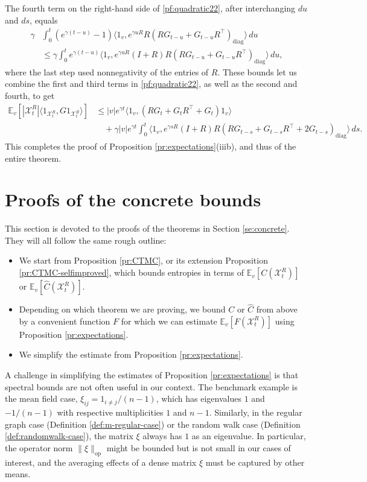 \documentclass[11pt,reqno]{amsart}
\numberwithin{equation}{section}
\theoremstyle{definition}
\def\CC{{C}}
\def\E{{\mathbb E}}
\def\X{{\mathcal X}}
\begin{document}
The fourth term on the right-hand side of  \eqref{pf:quadratic22}, after interchanging $du$ and $ds$, equals
\begin{align*}
 \gamma &\int_0^t (e^{\gamma (t-u)} - 1)  \langle 1_v, e^{\gamma uR} R (R G_{t-u} + G_{t-u}R^\top)_{\mathrm{diag}}\rangle  \,du \\
 &\le \gamma \int_0^t e^{\gamma (t-u)}   \langle 1_v, e^{\gamma uR} (I+R)R (R G_{t-u} + G_{t-u}R^\top)_{\mathrm{diag}}\rangle  \,du,
\end{align*}
where the last step used nonnegativity of the entries of $R$.
These  bounds let us combine the first and third terms in \eqref{pf:quadratic22}, as well as the second and fourth, to get
\begin{align*}
\E_v[  |\X^{R}_t|\langle 1_{\X^{R}_t},G1_{\X^{R}_t}\rangle ] &\le |v| e^{\gamma t} \langle 1_v, (R G_t + G_t R^\top + G_t)1_v\rangle \\
	&\quad +  \gamma |v| e^{\gamma t} \int_0^t  \langle 1_v,e^{\gamma s  R }(I+R)R(R G_{t-s} + G_{t-s}R^\top + 2 G_{t-s})_{\mathrm{diag}}\rangle   \,ds.
\end{align*}
This completes the proof of Proposition \ref{pr:expectations}(iiib), and thus of the entire theorem. 



\section{Proofs of the concrete bounds} \label{se:proofs-concrete}



This section is devoted to the proofs of the theorems in Section \ref{se:concrete}. They will all follow the same rough outline:
\begin{itemize}
\item We start from Proposition \ref{pr:CTMC}, or its extension Proposition \ref{pr:CTMC-selfimproved}, which bounds entropies in terms of $\E_v[\CC(\X^{R}_t)]$ or $\E_v[\widehat{\CC}(\X^{R}_t)]$.
\item Depending on which theorem we are proving, we bound $\CC$ or $\widehat{\CC}$ from above by a convenient function $F$ for which we can estimate $\E_v[F(\X^{R}_t)]$ using Proposition \ref{pr:expectations}.
\item We simplify the estimate from Proposition \ref{pr:expectations}.
\end{itemize}
A challenge in simplifying the estimates of Proposition \ref{pr:expectations} is that spectral bounds are not often useful in our context. The benchmark example is the mean field case, $\xi_{ij}=1_{i \neq j}/(n-1)$, which has eigenvalues $1$ and $-1/(n-1)$ with respective multiplicities $1$ and $n-1$. Similarly, in the regular graph case (Definition \ref{def:m-regular-case}) or the random walk case (Definition \ref{def:randomwalk-case}), the matrix $\xi$ always has $1$ as an eigenvalue.  In particular, the operator norm $\|\xi\|_{\mathrm{op}}$ might be bounded but is not small in our  cases of interest, and the averaging effects of a dense matrix $\xi$ must be captured by other means.
\end{document}
